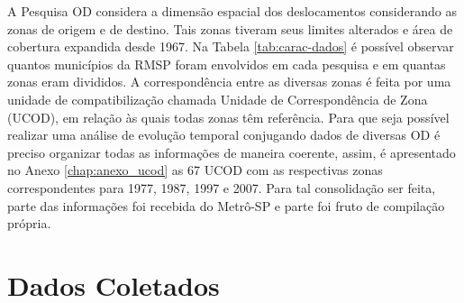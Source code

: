 A Pesquisa OD considera a dimensão espacial dos deslocamentos considerando as zonas de origem e de destino. Tais zonas tiveram seus limites alterados e área de cobertura expandida desde 1967. Na Tabela \ref{tab:carac-dados} é possível observar quantos municípios da RMSP foram envolvidos em cada pesquisa e em quantas zonas eram divididos. A correspondência entre as diversas zonas é feita por uma unidade de compatibilização chamada Unidade de Correspondência de Zona (UCOD), em relação às quais todas zonas têm referência. Para que seja possível realizar uma análise de evolução temporal conjugando dados de diversas OD é preciso organizar todas as informações de maneira coerente, assim, é apresentado no Anexo \ref{chap:anexo_ucod} as 67 UCOD  com as respectivas zonas correspondentes para 1977, 1987, 1997 e 2007. Para tal consolidação ser feita, parte das informações foi recebida do Metrô-SP e parte foi fruto de compilação própria.


\begin{table}[htb]
\end{table}

\section{Dados Coletados}\label{sec:OD-dados-coletados}

